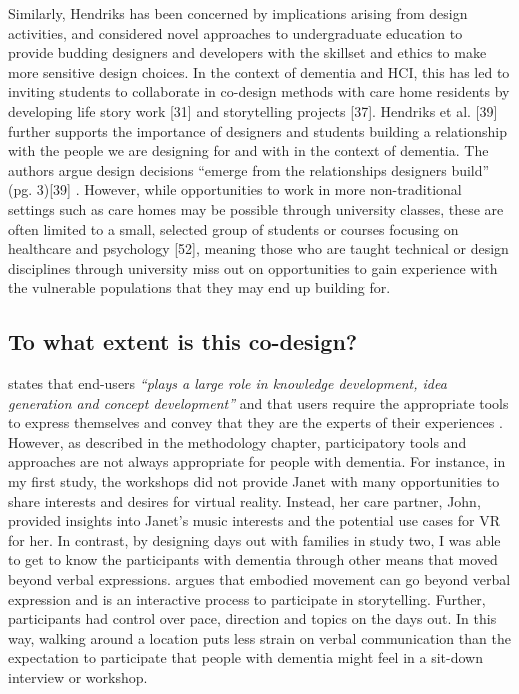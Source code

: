 Similarly, Hendriks has been concerned by implications arising from design activities, and considered novel approaches to undergraduate education to provide budding designers and developers with the skillset and ethics to make more sensitive design choices. In the context of dementia and HCI, this has led to inviting students to collaborate in co-design methods with care home residents by developing life story work [31] and storytelling projects [37]. Hendriks et al. [39] further supports the importance of designers and students building a relationship with the people we are designing for and with in the context of dementia. The authors argue design decisions “emerge from the relationships designers build” (pg. 3)[39] . However, while opportunities to work in more non-traditional settings such as care homes may be possible through university classes, these are often limited to a small, selected group of students or courses focusing on healthcare and psychology [52], meaning those who are taught technical or design disciplines through university miss out on opportunities to gain experience with the vulnerable populations that they may end up building for. 

\subsection{To what extent is this co-design?}
\label{extent-co-design}

\cite{sanders2008co} states that end-users \textit{``plays a large role in knowledge development, idea generation and concept development''} and that users require the appropriate tools to express themselves and convey that they are the experts of their experiences \citep{visser2005contextmapping}. However, as described in the methodology chapter, participatory tools and approaches are not always appropriate for people with dementia. For instance, in my first study, the workshops did not provide Janet with many opportunities to share interests and desires for virtual reality. Instead, her care partner, John, provided insights into Janet's music interests and the potential use cases for VR for her. In contrast, by designing days out with families in study two, I was able to get to know the participants with dementia through other means that moved beyond verbal expressions. \cite{hyden2013storytelling} argues that embodied movement can go beyond verbal expression and is an interactive process to participate in storytelling. Further, participants had control over pace, direction and topics on the days out. In this way, walking around a location puts less strain on verbal communication than the expectation to participate that people with dementia might feel in a sit-down interview or workshop. 


